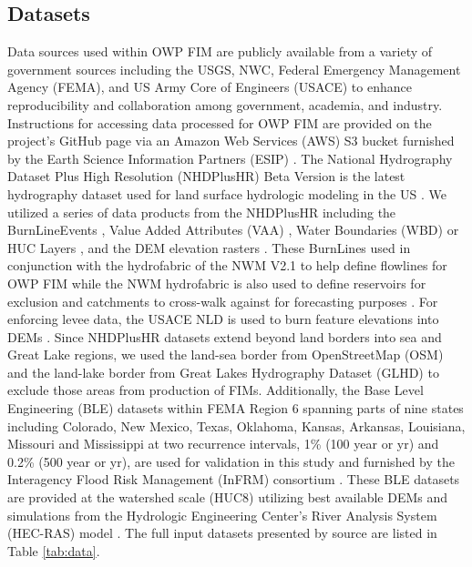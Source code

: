 \documentclass[draft]{dependencies/agujournal2019}
\begin{document}
\subsection{Datasets}
\label{ssec:datasets}
%
Data sources used within OWP FIM are publicly available from a variety of government sources including the USGS, NWC, Federal Emergency Management Agency (FEMA), and US Army Core of Engineers (USACE) to enhance reproducibility and collaboration among government, academia, and industry.
Instructions for accessing data processed for OWP FIM are provided on the project's GitHub page via an Amazon Web Services (AWS) S3 bucket furnished by the Earth Science Information Partners (ESIP) \cite{esipData2022}.
The National Hydrography Dataset Plus High Resolution (NHDPlusHR) Beta Version is the latest hydrography dataset used for land surface hydrologic modeling in the US \cite{moore2019user}.
We utilized a series of data products from the NHDPlusHR including the BurnLineEvents \cite{nhdplus2022vectors}, Value Added Attributes (VAA) \cite{nhdplus2022vectors}, Water Boundaries (WBD) or HUC Layers \cite{nhdplus2022wbd}, and the DEM elevation rasters \cite{nhdplus2022dems}.
These BurnLines used in conjunction with the hydrofabric of the NWM V2.1 to help define flowlines for OWP FIM while the NWM hydrofabric is also used to define reservoirs for exclusion and catchments to cross-walk against for forecasting purposes \cite{nwm2022hydrofabric}.
For enforcing levee data, the USACE NLD is used to burn feature elevations into DEMs \cite{engineers2016national}.
Since NHDPlusHR datasets extend beyond land borders into sea and Great Lake regions, we used the land-sea border from OpenStreetMap (OSM) \cite{osm2021landsea} and the land-lake border from Great Lakes Hydrography Dataset (GLHD) \cite{GreatLakesHydrographyDataset} to exclude those areas from production of FIMs.
Additionally, the Base Level Engineering (BLE) datasets within FEMA Region 6 spanning parts of nine states including Colorado, New Mexico, Texas, Oklahoma, Kansas, Arkansas, Louisiana, Missouri and Mississippi at two recurrence intervals, 1\% (100 year or yr) and 0.2\% (500 year or yr), are used for validation in this study and furnished by the Interagency Flood Risk Management (InFRM) consortium \cite{fema2021base,fema2021estimated}. 
These BLE datasets are provided at the watershed scale (HUC8) utilizing best available DEMs and simulations from the Hydrologic Engineering Center's River Analysis System (HEC-RAS) model \cite{us2022hydrologic}.
The full input datasets presented by source are listed in Table \ref{tab:data}.
\end{document}
